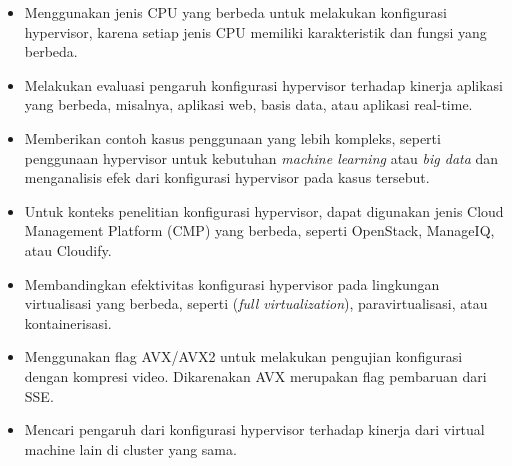 \begin{itemize}
	\item Menggunakan jenis CPU yang berbeda untuk melakukan konfigurasi hypervisor, karena setiap jenis CPU memiliki karakteristik dan fungsi yang berbeda.
	\item Melakukan evaluasi pengaruh konfigurasi hypervisor terhadap kinerja aplikasi yang berbeda, misalnya, aplikasi web, basis data, atau aplikasi real-time.
	\item Memberikan contoh kasus penggunaan yang lebih kompleks, seperti penggunaan hypervisor untuk kebutuhan \textit{machine learning} atau \textit{big data} dan menganalisis efek dari konfigurasi hypervisor pada kasus tersebut.
	\item Untuk konteks penelitian konfigurasi hypervisor, dapat digunakan jenis Cloud Management Platform (CMP) yang berbeda, seperti OpenStack, ManageIQ, atau Cloudify.
	\item Membandingkan efektivitas konfigurasi hypervisor pada lingkungan virtualisasi yang berbeda, seperti (\textit{full virtualization}), paravirtualisasi, atau kontainerisasi.
	\item Menggunakan flag AVX/AVX2 untuk melakukan pengujian konfigurasi dengan kompresi video. Dikarenakan AVX merupakan flag pembaruan dari SSE.
	\item Mencari pengaruh dari konfigurasi hypervisor terhadap kinerja dari virtual machine lain di cluster yang sama.
\end{itemize}